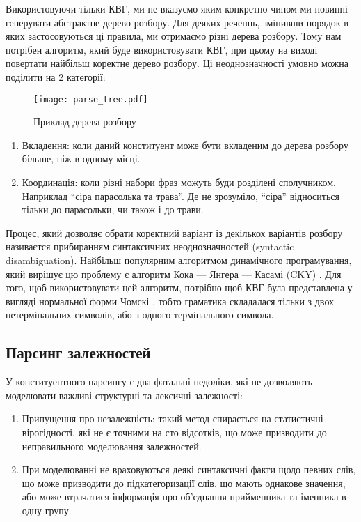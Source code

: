 Використовуючи тільки КВГ, ми не вказуємо яким конкретно чином ми повинні генерувати
абстрактне дерево розбору. Для деяких реченнь, змінивши порядок в яких застосовуються ці
правила, ми отримаємо різні дерева розбору. Тому нам потрібен алгоритм, який буде 
використовувати КВГ, при цьому на виході повертати найбільш коректне дерево розбору.
Ці неоднозначності умовно можна поділити на 2 категорії:
\begin{wrapfigure}{r}{0.3\textwidth}
 \texttt{[image: parse\_tree.pdf]} 
  \caption{Приклад дерева розбору}
  \label{text:parse_tree}
\end{wrapfigure}

\begin{enumerate}
    \item Вкладення: коли даний конституент може бути вкладеним до дерева розбору
    більше, ніж в одному місці.
    \item Координація: коли різні набори фраз можуть буди розділені сполучником.
    Наприклад ``сіра парасолька та трава''. Де не зрозуміло, ``сіра'' відноситься
    тільки до парасольки, чи також і до трави.
\end{enumerate}

Процес, який дозволяє обрати коректний варіант із декількох варіантів розбору називаєтся
прибиранням синтаксичних неоднозначностей (syntactic disambiguation). Найбільш
популярним алгоритмом динамічного програмування, який вирішує цю проблему є
алгоритм Кока — Янгера — Касамі (CKY) \cite{bib6}. Для того, щоб
використовувати цей алгоритм, потрібно щоб КВГ була представлена у вигляді
нормальної форми Чомскі \cite{bib7}, тобто граматика складалася тільки
з двох нетермінальних символів, або з одного термінального символа.

\subsection{Парсинг залежностей}
У конституентного парсингу є два фатальні недоліки, які не дозволяють
моделювати важливі структурні та лексичні залежності:
\begin{enumerate}
    \item Припущення про незалежність: такий метод спирається на статистичні
    вірогідності, які не є точними на сто відсотків, що може призводити до
    неправильного моделювання залежностей.
    \item При моделюванні не враховуються деякі синтаксичні факти щодо певних слів,
    що може призводити до підкатегоризації слів, що мають однакове значення,
    або може втрачатися інформація про об'єднання прийменника та іменника
    в одну групу.
\end{enumerate}

